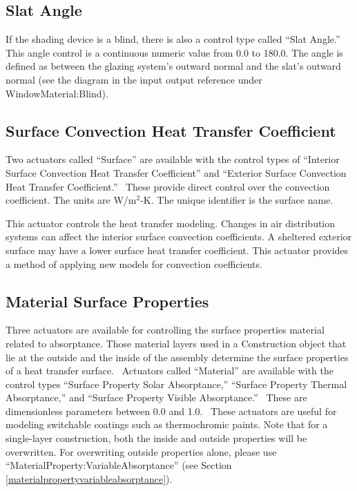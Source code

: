 \subsection{Slat Angle}\label{slat-angle}

If the shading device is a blind, there is also a control type called ``Slat Angle.''~ This angle control is a continuous numeric value from 0.0 to 180.0. The angle is defined as between the glazing system's outward normal and the slat's outward normal (see the diagram in the input output reference under WindowMaterial:Blind).

\subsection{Surface Convection Heat Transfer Coefficient}\label{surface-convection-heat-transfer-coefficient}

Two actuators called ``Surface'' are available with the control types of ``Interior Surface Convection Heat Transfer Coefficient'' and ``Exterior Surface Convection Heat Transfer Coefficient.''~ These provide direct control over the convection coefficient. The units are W/m\(^{2}\)-K. The unique identifier is the surface name.

This actuator controls the heat transfer modeling. Changes in air distribution systems can affect the interior surface convection coefficients. A sheltered exterior surface may have a lower surface heat transfer coefficient. This actuator provides a method of applying new models for convection coefficients.

\subsection{Material Surface Properties}\label{material-surface-properties}

Three actuators are available for controlling the surface properties material
related to absorptance. Those material layers used in a Construction object that
lie at the outside and the inside of the assembly determine the surface
properties of a heat transfer surface.~ Actuators called ``Material'' are
available with the control types ``Surface Property Solar Absorptance,''
``Surface Property Thermal Absorptance,'' and ``Surface Property Visible
Absorptance.''~ These are dimensionless parameters between 0.0 and 1.0.~ These
actuators are useful for modeling switchable coatings such as thermochromic
paints. Note that for a single-layer construction, both the inside and outside
properties will be overwritten. For overwriting outside properties alone, please
use ``MaterialProperty:VariableAbsorptance'' (see Section
\ref{materialpropertyvariableabsorptance}).

